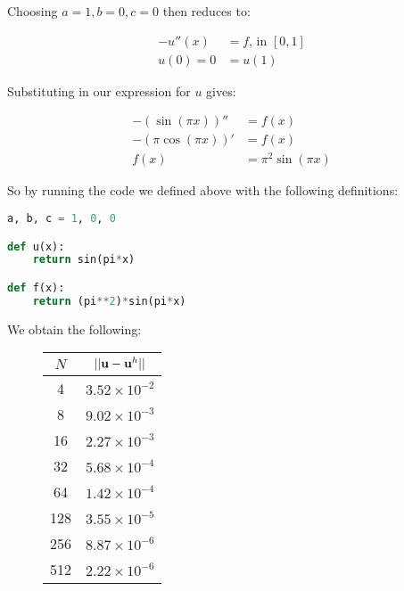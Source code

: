 Choosing $a = 1, b = 0, c = 0$ then  reduces to:

\begin{align*}
    -u''(x) &= f \text{,  in } [0,1] \\
    u(0) = 0 &= u(1)
\end{align*}

Substituting in our expression for $u$ gives:

\begin{align*}
    -(\sin{(\pi x)})'' &= f(x) \\
    -(\pi\cos{(\pi x)})' &= f(x) \\
    f(x) &= \pi^2\sin{(\pi x)}
\end{align*}

So by running the code we defined above with the following definitions:

\begin{lstlisting}[language=Python]
a, b, c = 1, 0, 0

def u(x):
    return sin(pi*x)

def f(x):
    return (pi**2)*sin(pi*x)
\end{lstlisting}

We obtain the following:

\begin{figure}
\centering
\begin{minipage}{.5\textwidth}
    \centering
    \begin{tabular}{| c | c |} \hline
        $N$ & $||\mathbf{u} - \mathbf{u}^h||$ \\ \hline
        4 & $3.52\times10^{-2}$ \\
        8 & $9.02\times10^{-3}$ \\
        16 & $2.27\times10^{-3}$ \\
        32 & $5.68\times10^{-4}$ \\
        64 & $1.42\times10^{-4}$ \\
        128 & $3.55\times10^{-5}$ \\
        256 & $8.87\times10^{-6}$ \\
        512 & $2.22\times10^{-6}$ \\ \hline
    \end{tabular}
\end{minipage}
\begin{minipage}{.5\textwidth}
    \centering
\end{minipage}
\end{figure}
